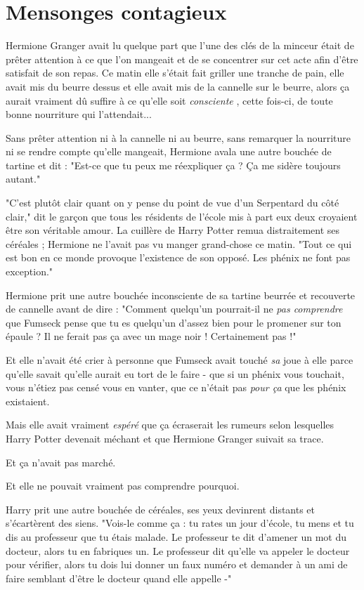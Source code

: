 
\chapter{Mensonges contagieux}

Hermione Granger avait lu quelque part que l'une des clés de la minceur était de prêter attention à ce que l'on mangeait et de se concentrer sur cet acte afin d'être satisfait de son repas. Ce matin elle s'était fait griller une tranche de pain, elle avait mis du beurre dessus et elle avait mis de la cannelle sur le beurre, alors ça aurait vraiment dû suffire à ce qu'elle soit \emph{consciente} , cette fois-ci, de toute bonne nourriture qui l'attendait...

Sans prêter attention ni à la cannelle ni au beurre, sans remarquer la nourriture ni se rendre compte qu'elle mangeait, Hermione avala une autre bouchée de tartine et dit : "Est-ce que tu peux me réexpliquer ça ? Ça me sidère toujours autant."

"C'est plutôt clair quant on y pense du point de vue d'un Serpentard du côté clair," dit le garçon que tous les résidents de l'école mis à part eux deux croyaient être son véritable amour. La cuillère de Harry Potter remua distraitement ses céréales ; Hermione ne l'avait pas vu manger grand-chose ce matin. "Tout ce qui est bon en ce monde provoque l'existence de son opposé. Les phénix ne font pas exception."

Hermione prit une autre bouchée inconsciente de sa tartine beurrée et recouverte de cannelle avant de dire : "Comment quelqu'un pourrait-il ne \emph{pas comprendre}  que Fumseck pense que tu es quelqu'un d'assez bien pour le promener sur ton épaule ? Il ne ferait pas ça avec un mage noir ! Certainement pas !"

Et elle n'avait été crier à personne que Fumseck avait touché \emph{sa}  joue à elle parce qu'elle savait qu'elle aurait eu tort de le faire - que si un phénix vous touchait, vous n'étiez pas censé vous en vanter, que ce n'était pas \emph{pour ça } que les phénix existaient.

Mais elle avait vraiment \emph{espéré}  que ça écraserait les rumeurs selon lesquelles Harry Potter devenait méchant et que Hermione Granger suivait sa trace.

Et ça n'avait pas marché.

Et elle ne pouvait vraiment pas comprendre pourquoi.

Harry prit une autre bouchée de céréales, ses yeux devinrent distants et s'écartèrent des siens. "Vois-le comme ça : tu rates un jour d'école, tu mens et tu dis au professeur que tu étais malade. Le professeur te dit d'amener un mot du docteur, alors tu en fabriques un. Le professeur dit qu'elle va appeler le docteur pour vérifier, alors tu dois lui donner un faux numéro et demander à un ami de faire semblant d'être le docteur quand elle appelle -"

